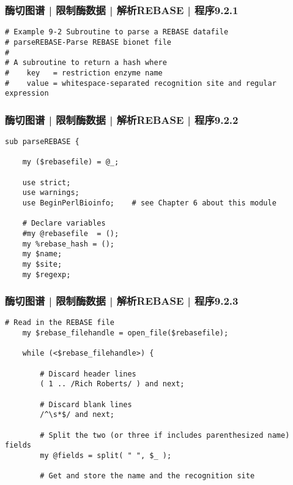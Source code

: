 \begin{frame}[fragile]
  \frametitle{酶切图谱 | 限制酶数据 | 解析REBASE | 程序9.2.1}
\begin{lstlisting}[firstnumber=1]
# Example 9-2 Subroutine to parse a REBASE datafile
# parseREBASE-Parse REBASE bionet file
#
# A subroutine to return a hash where
#    key   = restriction enzyme name
#    value = whitespace-separated recognition site and regular expression
\end{lstlisting}
\end{frame}

\begin{frame}[fragile]
  \frametitle{酶切图谱 | 限制酶数据 | 解析REBASE | 程序9.2.2}
\begin{lstlisting}[firstnumber=8]
sub parseREBASE {

    my ($rebasefile) = @_;

    use strict;
    use warnings;
    use BeginPerlBioinfo;    # see Chapter 6 about this module

    # Declare variables
    #my @rebasefile  = ();
    my %rebase_hash = ();
    my $name;
    my $site;
    my $regexp;
\end{lstlisting}
\end{frame}

\begin{frame}[fragile]
  \frametitle{酶切图谱 | 限制酶数据 | 解析REBASE | 程序9.2.3}
  \vspace{-0.6em}
\begin{lstlisting}[firstnumber=23,basicstyle=\small\tt,numberstyle=\footnotesize]
    # Read in the REBASE file
    my $rebase_filehandle = open_file($rebasefile);

    while (<$rebase_filehandle>) {

        # Discard header lines
        ( 1 .. /Rich Roberts/ ) and next;

        # Discard blank lines
        /^\s*$/ and next;

        # Split the two (or three if includes parenthesized name) fields
        my @fields = split( " ", $_ );

        # Get and store the name and the recognition site
\end{lstlisting}
\end{frame}

